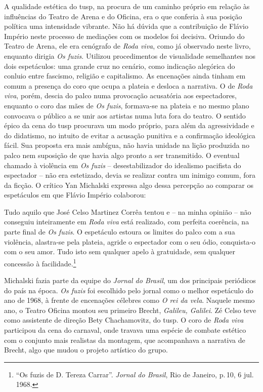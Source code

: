 A qualidade estética do {\sc tusp}, na procura de um caminho próprio em
relação às influências do Teatro de Arena e do Oficina, era o que
conferia à sua posição política uma intensidade vibrante. Não há dúvida
que a contribuição de Flávio Império neste processo de mediações com os
modelos foi decisiva. Oriundo do Teatro de Arena, ele era cenógrafo de
{\it Roda viva}, como já observado neste livro, enquanto dirigia {\it Os
fuzis}. Utilizou procedimentos de visualidade semelhantes nos dois
espetáculos: uma grande cruz no cenário, como indicação alegórica do
conluio entre fascismo, religião e capitalismo. As encenações ainda
tinham em comum a presença do coro que ocupa a plateia e desloca a
narrativa. O de {\it Roda viva}, porém, descia do palco numa provocação
acusatória aos espectadores, enquanto o coro das mães de {\it Os fuzis},
formava-se na plateia e no mesmo plano convocava o público a se unir aos
artistas numa luta fora do teatro. O sentido épico da cena do {\sc tusp}
procurava um modo próprio, para além da agressividade e do didatismo, no
intuito de evitar a acusação punitiva e a confirmação ideológica fácil.
Sua proposta era mais ambígua, não havia unidade na lição produzida no
palco nem suposição de que havia algo pronto a ser transmitido. O
eventual chamado à violência em {\it Os fuzis} -- desestabilizador do
idealismo pacifista do espectador -- não era estetizado, devia se
realizar contra um inimigo comum, fora da ficção. O crítico Yan
Michalski expressa algo dessa percepção ao comparar os espetáculos em
que Flávio Império colaborou:

\startblockquote
Tudo aquilo que José Celso Martinez Corrêa tentou e -- na minha opinião
-- não conseguiu inteiramente em {\it Roda viva} está realizado, com
perfeita coerência, na parte final de {\it Os fuzis}. O espetáculo
estoura os limites do palco com a sua violência, alastra-se pela
plateia, agride o espectador com o seu ódio, conquista-o com o seu amor.
Tudo isto sem qualquer apelo à gratuidade, sem qualquer concessão à
facilidade.\footnote{“Os fuzis de D. Tereza Carrar”. {\it Jornal do
  Brasil}, Rio de Janeiro, p.\,10, 6 jul. 1968.}
\stopblockquote


Michalski fazia parte da equipe do {\it Jornal do Brasil}, um dos
principais periódicos do país na época. {\it Os fuzis} foi escolhido
pelo jornal como o melhor espetáculo do ano de 1968, à frente de
encenações célebres como {\it O rei da vela}. Naquele mesmo ano, o
Teatro Oficina montou seu primeiro Brecht, {\it Galileu, Galilei}. Zé
Celso teve como assistente de direção Bety Chachamovitz, do {\sc tusp}. O coro
de {\it Roda viva} participou da cena do carnaval, onde travava uma
espécie de combate estético com o conjunto mais realistas da montagem,
que acompanhava a narrativa de Brecht, algo que mudou o projeto
artístico do grupo.

